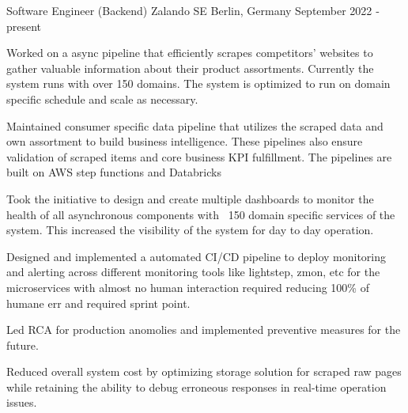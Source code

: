 \cventry
    {Software Engineer (Backend)}
    {Zalando SE}
    {Berlin, Germany}
    {September 2022 ‑ present}
    {
      \begin{cvitems}
        \item {Worked on a async pipeline that efficiently scrapes competitors' websites to gather valuable information about their product assortments. Currently the system runs with over 150 domains. The system is optimized to run on domain specific schedule and scale as necessary.}
        \item {Maintained consumer specific data pipeline that utilizes the scraped data and own assortment to build business intelligence. These pipelines also ensure validation of scraped items and core business KPI fulfillment. The pipelines are built on AWS step functions and Databricks}
        \item {Took the initiative to design and create multiple dashboards to monitor the health of all asynchronous components with ~150 domain specific services of the system. This increased the visibility of the system for day to day operation.}
        \item {Designed and implemented a automated CI/CD pipeline to deploy monitoring and alerting across different monitoring tools like lightstep, zmon, etc for the microservices with almost no human interaction required reducing 100\% of humane err and required sprint point.}
        \item {Led RCA for production anomolies and implemented preventive measures for the future.}
        \item {Reduced overall system cost by optimizing storage solution for scraped raw pages while retaining the ability to debug erroneous responses in real-time operation issues.}
      \end{cvitems}
    }
